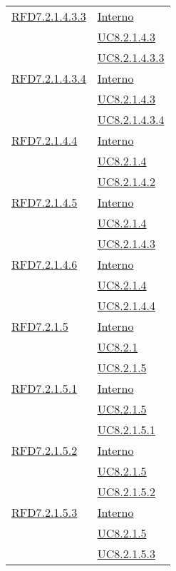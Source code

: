 \begin{longtable}{|>{\centering}m{5cm}|m{5cm}<{\centering}|}
\hyperlink{RFD7.2.1.4.3.3}{RFD7.2.1.4.3.3} & \hyperlink{Interno}{Interno}\\
& \hyperref[UC8.2.1.4.3]{UC8.2.1.4.3}\\
& \hyperref[UC8.2.1.4.3.3]{UC8.2.1.4.3.3}\\ \hline

\hyperlink{RFD7.2.1.4.3.4}{RFD7.2.1.4.3.4} & \hyperlink{Interno}{Interno}\\
& \hyperref[UC8.2.1.4.3]{UC8.2.1.4.3}\\
& \hyperref[UC8.2.1.4.3.4]{UC8.2.1.4.3.4}\\ \hline

\hyperlink{RFD7.2.1.4.4}{RFD7.2.1.4.4} & \hyperlink{Interno}{Interno}\\
& \hyperref[UC8.2.1.4]{UC8.2.1.4}\\
& \hyperref[UC8.2.1.4.2]{UC8.2.1.4.2}\\ \hline

\hyperlink{RFD7.2.1.4.5}{RFD7.2.1.4.5} & \hyperlink{Interno}{Interno}\\
& \hyperref[UC8.2.1.4]{UC8.2.1.4}\\
& \hyperref[UC8.2.1.4.3]{UC8.2.1.4.3}\\ \hline

\hyperlink{RFD7.2.1.4.6}{RFD7.2.1.4.6} & \hyperlink{Interno}{Interno}\\
& \hyperref[UC8.2.1.4]{UC8.2.1.4}\\
& \hyperref[UC8.2.1.4.4]{UC8.2.1.4.4}\\ \hline

\hyperlink{RFD7.2.1.5}{RFD7.2.1.5} & \hyperlink{Interno}{Interno}\\
& \hyperref[UC8.2.1]{UC8.2.1}\\
& \hyperref[UC8.2.1.5]{UC8.2.1.5}\\ \hline

\hyperlink{RFD7.2.1.5.1}{RFD7.2.1.5.1} & \hyperlink{Interno}{Interno}\\
& \hyperref[UC8.2.1.5]{UC8.2.1.5}\\
& \hyperref[UC8.2.1.5.1]{UC8.2.1.5.1}\\ \hline

\hyperlink{RFD7.2.1.5.2}{RFD7.2.1.5.2} & \hyperlink{Interno}{Interno}\\
& \hyperref[UC8.2.1.5]{UC8.2.1.5}\\
& \hyperref[UC8.2.1.5.2]{UC8.2.1.5.2}\\ \hline

\hyperlink{RFD7.2.1.5.3}{RFD7.2.1.5.3} & \hyperlink{Interno}{Interno}\\
& \hyperref[UC8.2.1.5]{UC8.2.1.5}\\
& \hyperref[UC8.2.1.5.3]{UC8.2.1.5.3}\\ \hline


\end{longtable}

